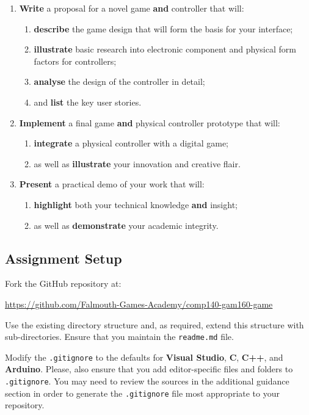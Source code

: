 \documentclass{../../fal_assignment}
\begin{document}
\begin{enumerate}[label=(\Alph*)]
    \item \textbf{Write} a proposal for a novel game \textbf{and} controller that will:
    	\begin{enumerate}[label=\roman*.]
    		\item \textbf{describe} the game design that will form the basis for your interface;
    		\item \textbf{illustrate} basic  research into electronic component and physical form factors for controllers;
		\item \textbf{analyse} the design of the controller in detail;
		\item and \textbf{list} the key user stories.
	\end{enumerate}
    \item \textbf{Implement} a final game \textbf{and} physical controller prototype that will:
    	\begin{enumerate}[label=\roman*.]
    		\item \textbf{integrate} a physical controller with a digital game;
		\item as well as \textbf{illustrate} your innovation and creative flair.
	\end{enumerate}
    \item \textbf{Present} a practical demo of your work that will:
    	\begin{enumerate}[label=\roman*.]
    		\item \textbf{highlight} both your technical knowledge \textbf{and} insight;
    		\item as well as \textbf{demonstrate} your academic integrity.
	\end{enumerate}
\end{enumerate}

	\subsection*{Assignment Setup}
	
	Fork the GitHub repository at:
	
	\indent \url{https://github.com/Falmouth-Games-Academy/comp140-gam160-game}
	
	Use the existing directory structure and, as required, extend this structure with sub-directories. Ensure that you maintain the \texttt{readme.md} file.
	
	Modify the \texttt{.gitignore} to the defaults for \textbf{Visual Studio}, \textbf{C}, \textbf{C++}, and \textbf{Arduino}. Please, also ensure that you add editor-specific files and folders to \texttt{.gitignore}. You may need to review the sources in the additional guidance section in order to generate the \texttt{.gitignore} file most appropriate to your repository. 
\end{document}
